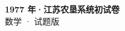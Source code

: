 \documentclass[zihao=-4, a4paper]{ctexart}
\begin{document}
\begin{center}
  {\Large\bfseries 1977 年·江苏农垦系统初试卷}\\[4pt]
  {\large 数学 · 试题版}
\end{center}
\medskip
{}

\end{document}
